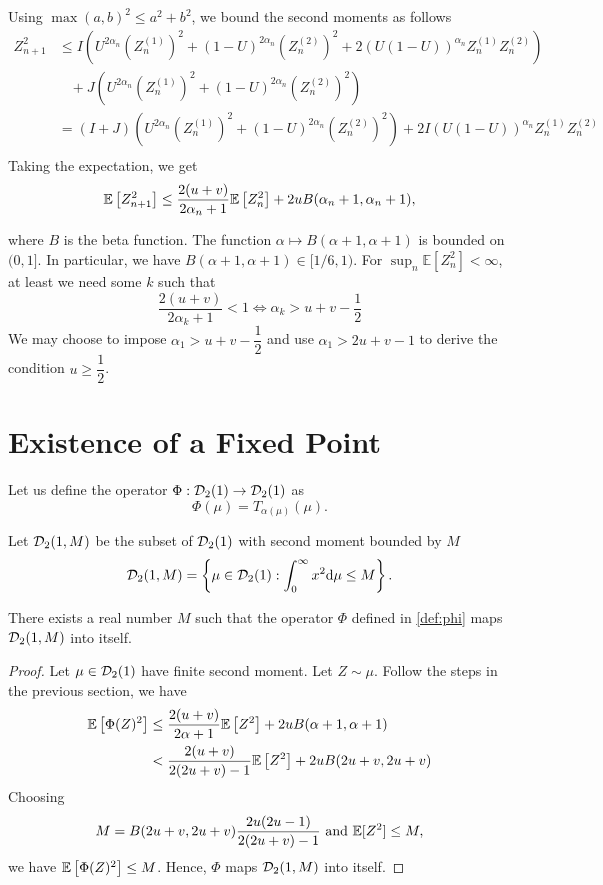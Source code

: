 Using $\max(a,b)^2 \le a^2 + b^2$, we bound the second moments as follows
\begin{align*}
  Z_{n+1}^2
   & \le I\left(U^{2\alpha_n} \left(Z_{n}^{(1)}\right)^2 + \left(1-U\right)^{2\alpha_n} \left(Z_{n}^{(2)}\right)^2+ 2\left(U(1-U)\right)^{\alpha_n} Z_{n}^{(1)}Z_{n}^{(2)}\right)    \\
   & \,\,\,\,\, + J\left(U^{2\alpha_n} \left(Z_{n}^{(1)}\right)^2 + \left(1-U\right)^{2\alpha_n} \left(Z_{n}^{(2)}\right)^2\right)                                                   \\
   & = (I+J)\left(U^{2\alpha_n} \left(Z_{n}^{(1)}\right)^2 + \left(1-U\right)^{2\alpha_n} \left(Z_{n}^{(2)}\right)^2\right)+2I \left(U(1-U)\right)^{\alpha_n} Z_{n}^{(1)}Z_{n}^{(2)} \\
\end{align*}
Taking the expectation, we get
$$\mathbb{E}\left[Z_{n+1}^2\right] \le \dfrac{2(u+v)}{2\alpha_n+1}\mathbb{E}\left[Z_{n}^2\right] + 2uB(\alpha_n+1, \alpha_n+1),$$

where $B$ is the beta function. The function $\alpha \mapsto B(\alpha+1, \alpha+1)$ is bounded on $(0,1]$. In particular, we have $B(\alpha+1, \alpha+1) \in [1/6,1)$. For $\sup_n \mathbb{E}[Z_n^2] < \infty$, at least we need some $k$ such that
$$\dfrac{2(u+v)}{2\alpha_k+1} < 1 \iff \alpha_k > u+v - \dfrac{1}{2}$$
We may choose to impose $\alpha_1 > u+v - \dfrac{1}{2}$ and use $\alpha_1 > 2u+v-1$ to derive the condition $u\ge \dfrac{1}{2}$.


\section{Existence of a Fixed Point}
Let us define the operator $\Phi: \mathcal{D}_2(1) \to \mathcal{D}_2(1)$ as
\begin{equation}
  \label{def:phi}
  \Phi(\mu) = T_{\alpha(\mu)}(\mu).
\end{equation}

Let $\mathcal{D}_2(1, M)$ be the subset of $\mathcal{D}_2(1)$ with second moment bounded by $M$
$$\mathcal{D}_2(1, M) = \left\{\mu \in \mathcal{D}_2(1): \int_0^\infty x^2\mathrm{d}\mu \le M\right\}.$$

\begin{lemma}
  There exists a real number $M$ such that the operator $\Phi$ defined in \ref{def:phi} maps $\mathcal{D}_2(1, M)$ into itself.
\end{lemma}
\begin{proof}
  Let $\mu\in\mathcal{D}_2(1)$ have finite second moment. Let $Z\sim \mu$. Follow the steps in the previous section, we have
  \begin{align*}
    \mathbb{E}\left[\Phi(Z)^2\right]
     & \le \dfrac{2(u+v)}{2\alpha+1}\mathbb{E}\left[Z^2\right] + 2uB(\alpha+1, \alpha+1) \\
     & < \dfrac{2(u+v)}{2(2u+v)-1}\mathbb{E}\left[Z^2\right] + 2uB(2u+v, 2u+v)           \\
  \end{align*}
  Choosing
  $$M = B(2u+v, 2u+v)\dfrac{2u(2u-1)}{2(2u+v)-1} \text{ and } \mathbb{E}[Z^2] \le M,$$
  we have $\mathbb{E}\left[\Phi(Z)^2\right] \le M$. Hence, $\Phi$ maps $\mathcal{D}_2(1, M)$ into itself.
\end{proof}

